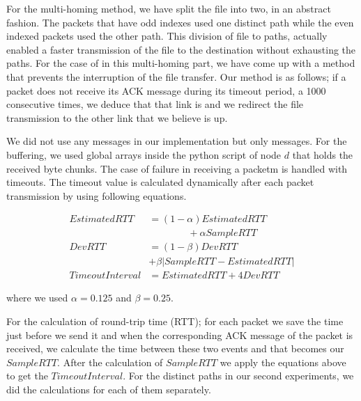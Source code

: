 \documentclass[conference]{IEEEtran}
\begin{document}
    For the multi-homing method, we have split the file into two, in an abstract fashion. The packets that have odd indexes used one distinct path while the even indexed packets used the other path. This division of file to paths, actually enabled a faster transmission of the file to the destination without exhausting the paths. For the case of  in this multi-homing part, we have come up with a method that prevents the interruption of the file transfer. Our method is as follows; if a packet does not receive its ACK message during its timeout period, a 1000 consecutive times, we deduce that that link is  and we redirect the file transmission to the other link that we believe is up.
    
    We did not use any  messages in our implementation but only  messages. For the buffering, we used global arrays inside the python script of node $d$ that holds the received byte chunks. The case of failure in receiving a packetm is handled with timeouts. The timeout value is calculated dynamically after each packet transmission by using following equations.
    
    \begin{equation}
        \begin{split}
            EstimatedRTT & = (1-\alpha ) EstimatedRTT\\
            & \qquad \qquad + \alpha SampleRTT\\
            DevRTT & = (1-\beta ) DevRTT \\ &  + \beta | SampleRTT - EstimatedRTT |\\
            TimeoutInterval & = EstimatedRTT + 4DevRTT
        \end{split}
    \end{equation}
    
    
    where we used $\alpha = 0.125$ and $\beta = 0.25$.
  
    For the calculation of round-trip time (RTT); for each packet we save the time just before we send it and when the corresponding ACK message of the packet is received, we calculate the time between these two events and that becomes our $SampleRTT$. After the calculation of $SampleRTT$ we apply the equations above to get the $TimeoutInterval$. For the distinct paths in our second experiments, we did the calculations for each of them separately.
    
    
\end{document}
